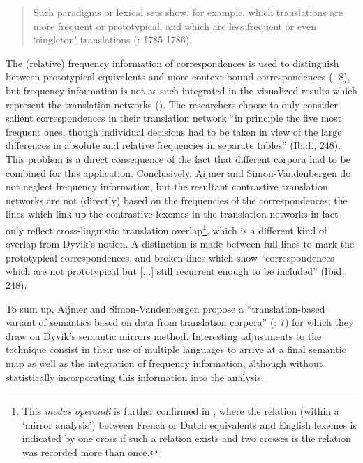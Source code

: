 \begin{quote}
Such paradigms or lexical sets show, for example, which translations are more frequent or prototypical, and which are less frequent or even ‘singleton’ translations (\citealt{aijmer_model_2004}: 1785-1786).
\end{quote}


The (relative) frequency information of correspondences is used to distinguish between prototypical equivalents and more context-bound correspondences (\citealt{simon-vandenbergen_semantic_2007}: 8), but frequency information is not as such integrated in the visualized results which represent the translation networks (\citealt[250-253]{simon-vandenbergen_semantic_2007}). The researchers choose to only consider salient correspondences in their translation network “in principle the five most frequent ones, though individual decisions had to be taken in view of the large differences in absolute and relative frequencies in separate tables” (Ibid., 248). This problem is a direct consequence of the fact that different corpora had to be combined for this application. Conclusively, Aijmer and Simon-Vandenbergen do not neglect frequency information, but the resultant contrastive translation networks are not (directly) based on the frequencies of the correspondences; the lines which link up the contrastive lexemes in the translation networks in fact only reflect cross-linguistic translation overlap\footnote{This \textit{modus} \textit{operandi} is further confirmed in \citet[93-94]{simon-vandenbergen_english_2013}, where the relation (within a ‘mirror analysis’) between French or Dutch equivalents and English lexemes is indicated by one cross if such a relation exists and two crosses is the relation was recorded more than once.}, which is a different kind of overlap from Dyvik’s notion. A distinction is made between full lines to mark the prototypical correspondences, and broken lines which show “correspondences which are not prototypical but [...] still recurrent enough to be included” (Ibid., 248).



To sum up, Aijmer and Simon-Vandenbergen propose a “translation-based variant of semantics based on data from translation corpora” (\citealt{simon-vandenbergen_semantic_2007}: 7) for which they draw on Dyvik’s semantic mirrors method. Interesting adjustments to the technique consist in their use of multiple languages to arrive at a final semantic map as well as the integration of frequency information, although without statistically incorporating this information into the analysis.


